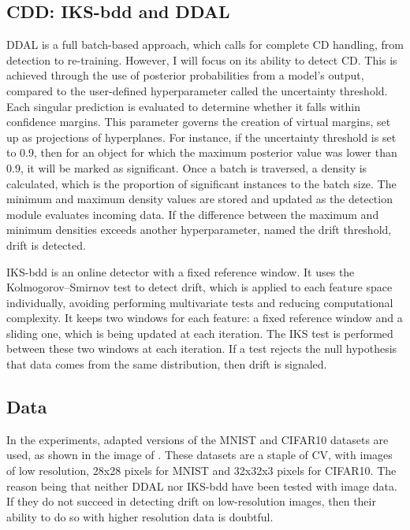 \documentclass[a4paper]{article}
\begin{document}
\subsection{CDD: IKS-bdd and DDAL}

DDAL is a full batch-based approach, which calls for complete CD handling, from detection to re-training. However, I will focus on its ability to detect CD. This is achieved through the use of posterior probabilities from a model's output, compared to the user-defined hyperparameter called the uncertainty threshold. Each singular prediction is evaluated to determine whether it falls within confidence margins. This parameter governs the creation of virtual margins, set up as projections of hyperplanes. For instance, if the uncertainty threshold is set to 0.9, then for an object for which the maximum posterior value was lower than 0.9, it will be marked as significant. Once a batch is traversed, a density is calculated, which is the proportion of significant instances to the batch size. The minimum and maximum density values are stored and updated as the detection module evaluates incoming data. If the difference between the maximum and minimum densities exceeds another hyperparameter, named the drift threshold, drift is detected.

IKS-bdd is an online detector with a fixed reference window. It uses the Kolmogorov–Smirnov test to detect drift, which is applied to each feature space individually, avoiding performing multivariate tests and reducing computational complexity. It keeps two windows for each feature: a fixed reference window and a sliding one, which is being updated at each iteration. The IKS test is performed between these two windows at each iteration. If a test rejects the null hypothesis that data comes from the same distribution, then drift is signaled. 

\subsection{Data}
\label{sec:data}

In the experiments, adapted versions of the MNIST and CIFAR10 datasets are used, as shown in the image of \cite{suprem_odin_2020}. These datasets are a staple of CV, with images of low resolution, 28x28 pixels for MNIST and 32x32x3 pixels for CIFAR10. The reason being that neither DDAL nor IKS-bdd have been tested with image data. If they do not succeed in detecting drift on low-resolution images, then their ability to do so with higher resolution data is doubtful.
\end{document}
